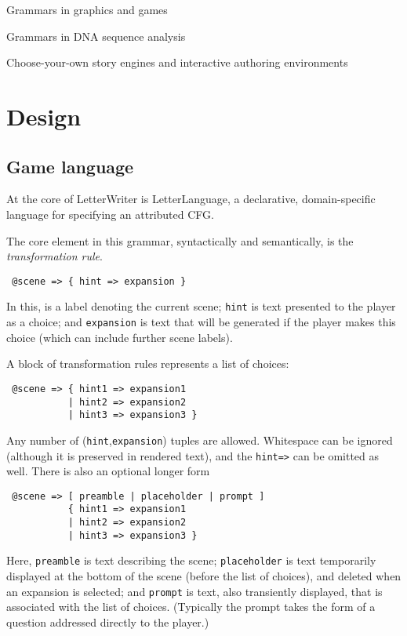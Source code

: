 \documentclass{acm_proc_article-sp}
\begin{document}
Grammars in graphics and games
\cite{LSystems}
\cite{Sims3}

Grammars in DNA sequence analysis
\cite{Durbin98}

Choose-your-own story engines and interactive authoring environments
\cite{Twine,InkleWriter,ChoiceScript,Undum,RenPy}


\section{Design}

\subsection{Game language}

At the core of LetterWriter is LetterLanguage,
a declarative, domain-specific language for specifying an attributed CFG.

The core element in this grammar, syntactically and semantically, is the {\em transformation rule}.
\begin{verbatim}
 @scene => { hint => expansion }
\end{verbatim}
In this, {\tt \@scene} is a label denoting the current scene;
{\tt hint} is text presented to the player as a choice;
and {\tt expansion} is text that will be generated if the player makes this choice
(which can include further scene labels).

A block of transformation rules represents a list of choices:
\begin{verbatim}
 @scene => { hint1 => expansion1
           | hint2 => expansion2
           | hint3 => expansion3 }
\end{verbatim}
Any number of ({\tt hint},{\tt expansion}) tuples are allowed.
Whitespace can be ignored (although it is preserved in rendered text),
and the {\tt hint=>} can be omitted as well.
There is also an optional longer form
\begin{verbatim}
 @scene => [ preamble | placeholder | prompt ]
           { hint1 => expansion1
           | hint2 => expansion2
           | hint3 => expansion3 }
\end{verbatim}

Here, {\tt preamble} is text describing the scene;
{\tt placeholder} is text temporarily displayed at the bottom of the scene (before the list of choices),
and deleted when an expansion is selected;
and {\tt prompt} is text, also transiently displayed, that is associated with the list of choices.
(Typically the prompt takes the form of a question addressed directly to the player.)
\end{document}
